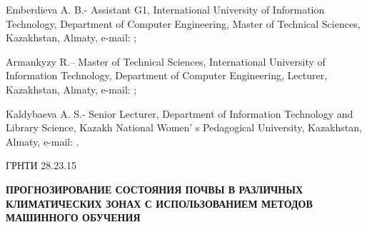 Emberdieva A. B.- Assistant G1, International University of Information
Technology, Department of Computer Engineering, Master of Technical
Sciences, Kazakhstan, Almaty, e-mail:
\href{mailto:a.yemberdiyeva@iitu.edu.kz}{};

Armankyzy R.-- Master of Technical Sciences, International University of
Information Technology, Department of Computer Engineering, Lecturer,
Kazakhstan, Almaty, e-mail:
\href{mailto:armankyzyrenata@gmail.com}{};

Kaldybaeva A. S.- Senior Lecturer, Department of Information Technology
and Library Science, Kazakh National Women' s Pedagogical
University, Kazakhstan, Almaty, e-mail:
\href{mailto:aizhan.seisebek@gmail.com}{}.

ГРНТИ 28.23.15

{\bfseries ПРОГНОЗИРОВАНИЕ СОСТОЯНИЯ ПОЧВЫ В РАЗЛИЧНЫХ КЛИМАТИЧЕСКИХ ЗОНАХ
С ИСПОЛЬЗОВАНИЕМ МЕТОДОВ МАШИННОГО ОБУЧЕНИЯ}

